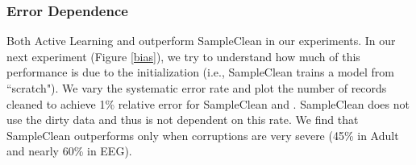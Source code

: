 \subsubsection{Error Dependence}
Both Active Learning and \sys outperform SampleClean in our experiments.
In our next experiment (Figure \ref{bias}), we try to understand how much of this performance 
is due to the initialization (i.e., SampleClean trains a model from ``scratch").
We vary the systematic error rate and plot the number of records cleaned to achieve 1\% relative error for SampleClean and \sys.
SampleClean does not use the dirty data and thus is not dependent on this rate.
We find that SampleClean outperforms \sys only when corruptions are very severe (45\% in Adult and nearly 60\% in EEG). 

